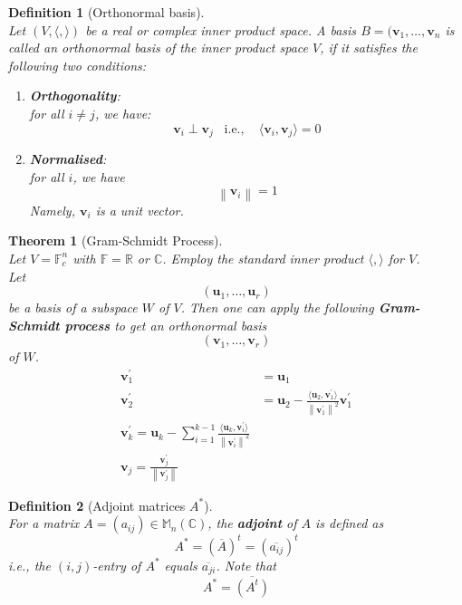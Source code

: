 \documentclass[12pt]{article}
\newcommand\norm[1]{\left\lVert#1\right\rVert}
\newtheorem{definition}{Definition}[section]
\newtheorem{theorem}{Theorem}[section]
\theoremstyle{definition}
\begin{document}
\begin{definition}[Orthonormal basis]
\hfill\\\normalfont Let $(V,\langle,\rangle)$ be a real or complex inner product space. A basis $B = (\mathbf{v}_1,\ldots,\mathbf{v}_n$ is called an orthonormal basis of the inner product space $V$, if it satisfies the following two conditions:
\begin{enumerate}[label =(\arabic*)]
\item \textbf{Orthogonality}:\\
for all $i\neq j$, we have:
\[
\mathbf{v}_i\perp \mathbf{v}_j\;\;\;\text{i.e., }\;\;\;\langle\mathbf{v}_i,\mathbf{v}_j\rangle = 0
\] 
\item \textbf{Normalised}:\\
for all $i$, we have
\[
\norm{\mathbf{v}_i}=1
\]
Namely, $\mathbf{v}_i$ is a unit vector.
\end{enumerate}
\end{definition}
\begin{theorem}[Gram-Schmidt Process]
\hfill\\\normalfont Let $V=\mathbb{F}_c^n$ with $\mathbb{F}=\mathbb{R}$ or $\mathbb{C}$. Employ the standard inner product $\langle,\rangle$ for $V$.\\
Let 
\[
(\mathbf{u}_1,\ldots,\mathbf{u}_r)
\]
be a basis of a subspace $W$ of $V$. Then one can apply the following \textbf{Gram-Schmidt process} to get an orthonormal basis
\[
(\mathbf{v}_1,\ldots,\mathbf{v}_r)
\]
of $W$.
\[
\begin{aligned}
\mathbf{v}_1^\prime &= \mathbf{u}_1\\
\mathbf{v}_2^\prime&=\mathbf{u}_2 -\frac{\langle \mathbf{u}_2, \mathbf{v}_1^\prime\rangle}{\norm{\mathbf{v}_1^\prime}^2}\mathbf{v}_1^\prime\\
\mathbf{v}_k^\prime = \mathbf{u}_k-\sum_{i=1}^{k-1}\frac{\langle\mathbf{u}_k, \mathbf{v}_i^\prime\rangle}{\norm{\mathbf{v}_i^\prime}^2}\\
\mathbf{v}_j=\frac{\mathbf{v}_j^\prime}{\norm{\mathbf{v}_j^\prime}}
\end{aligned}
\]
\end{theorem}
\begin{definition}[Adjoint matrices $A^\ast$]
\hfill\\\normalfont For a matrix $A=(a_{ij})\in\mathbb{M}_n(\mathbb{C})$, the \textbf{adjoint} of $A$ is defined as
\[
A^\ast = (\overline{A})^t=(\overline{a_{ij}})^t
\]
i.e., the $(i,j)$-entry of $A^\ast$ equals $\overline{a_{ji}}$. Note that
\[
A^\ast=\overline{(A^t)}
\]
\end{definition}
\end{document}
